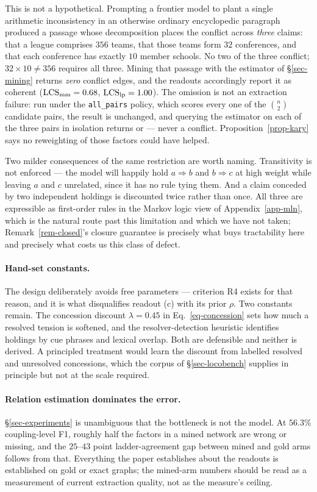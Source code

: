 This is not a hypothetical. Prompting a frontier model to plant a single arithmetic inconsistency in
an otherwise ordinary encyclopedic paragraph produced a passage whose decomposition places the
conflict across \emph{three} claims: that a league comprises $356$ teams, that those teams form $32$
conferences, and that each conference has exactly $10$ member schools. No two of the three conflict;
$32\times10\neq356$ requires all three. Mining that passage with the estimator of
\S\ref{sec-mining} returns \emph{zero} conflict edges, and the readouts accordingly report it as
coherent ($\mathrm{LCS}_{\mathrm{mm}}=0.68$, $\mathrm{LCS}_{\mathrm{lp}}=1.00$). The omission is not an extraction failure: run under
the \texttt{all\_pairs} policy, which scores every one of the $\binom{n}{2}$ candidate pairs, the
result is unchanged, and querying the estimator on each of the three pairs in isolation returns
 or \ent{} --- never a conflict. Proposition~\ref{prop-kary} says no reweighting of
those factors could have helped.

Two milder consequences of the same restriction are worth naming. Transitivity is not enforced ---
the model will happily hold $a\Rightarrow b$ and $b\Rightarrow c$ at high weight while leaving $a$ and
$c$ unrelated, since it has no rule tying them. And a claim conceded by two independent holdings is
discounted twice rather than once. All three are expressible as first-order rules in the Markov logic
view of Appendix~\ref{app-mln}, which is the natural route past this limitation and which we have not
taken; Remark~\ref{rem-closed}'s closure guarantee is precisely what buys tractability here and
precisely what costs us this class of defect.

\paragraph{Hand-set constants.} The design deliberately avoids free parameters --- criterion R4 exists
for that reason, and it is what disqualifies readout (c) with its prior $\rho$. Two constants remain.
The concession discount $\lambda=0.45$ in Eq.~\ref{eq-concession} sets how much a resolved tension is
softened, and the resolver-detection heuristic identifies holdings by cue phrases and lexical overlap.
Both are defensible and neither is derived. A principled treatment would learn the discount from
labelled resolved and unresolved concessions, which the corpus of \S\ref{sec-locobench} supplies in
principle but not at the scale required.

\paragraph{Relation estimation dominates the error.} \S\ref{sec-experiments} is unambiguous that the
bottleneck is not the model. At $56.3\%$ coupling-level F1, roughly half the factors in a mined network
are wrong or missing, and the $25$--$43$ point ladder-agreement gap between mined and gold arms follows
from that. Everything the paper establishes about the readouts is established on gold or exact graphs;
the mined-arm numbers should be read as a measurement of current extraction quality, not as the
measure's ceiling.

